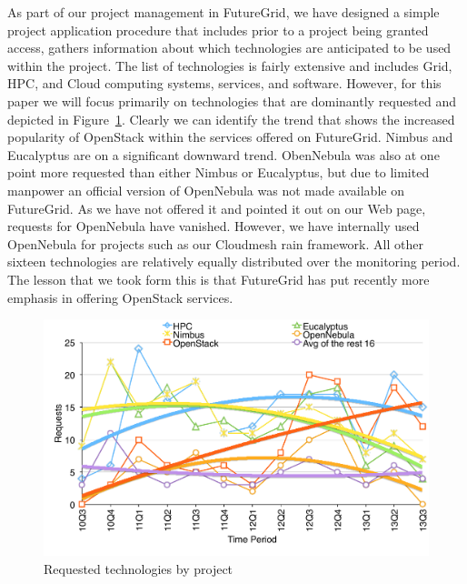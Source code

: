 \documentclass[graybox]{svmult}
\begin{document}
As part of our project management in FutureGrid, we have designed a simple project application procedure that includes prior to a project being granted access, gathers information about which technologies are anticipated to be used within the project. The list of technologies is fairly extensive and includes Grid, HPC, and Cloud computing systems, services, and software. However, for this paper we will focus primarily on technologies that are dominantly requested and depicted in Figure~\ref{F:request-tech}. Clearly we can identify the trend that shows the increased popularity of OpenStack within the services offered on FutureGrid. Nimbus and Eucalyptus are on a significant downward trend. ObenNebula was also at one point more requested than either Nimbus or Eucalyptus, but due to limited manpower an official version of OpenNebula was not made available on FutureGrid. As we have not offered it and pointed it out on our Web page, requests for OpenNebula have vanished.  However, we have internally used OpenNebula for projects such as our Cloudmesh rain framework. All other sixteen technologies are relatively equally distributed over the monitoring period. The lesson that we took form this is that FutureGrid has put recently more emphasis in offering OpenStack services.


\begin{figure}[htb]
 \centering
   \includegraphics[width=1.0\textwidth]{images/trend-a.pdf}
 \caption{Requested technologies by project}\label{F:request-tech}
\end{figure}
\end{document}
